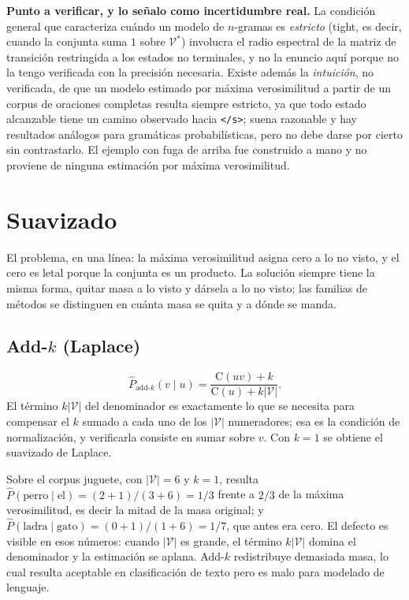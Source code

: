 \documentclass[11pt,letterpaper]{article}
\newcommand{\Count}{\mathrm{C}}
\newcommand{\Vocab}{\mathcal{V}}
\newcommand{\eos}{\texttt{</s>}}
\begin{document}
\begin{observacion}
\textbf{Punto a verificar, y lo señalo como incertidumbre real.} La condición
general que caracteriza cuándo un modelo de $n$-gramas es \emph{estricto}
(tight, es decir, cuando la conjunta suma $1$ sobre $\Vocab^*$) involucra el
radio espectral de la matriz de transición restringida a los estados no
terminales, y no la enuncio aquí porque no la tengo verificada con la precisión
necesaria. Existe además la \emph{intuición}, no verificada, de que un modelo
estimado por máxima verosimilitud a partir de un corpus de oraciones completas
resulta siempre estricto, ya que todo estado alcanzable tiene un camino
observado hacia \eos; suena razonable y hay resultados análogos para gramáticas
probabilísticas, pero no debe darse por cierto sin contrastarlo. El ejemplo con
fuga de arriba fue construido a mano y no proviene de ninguna estimación por
máxima verosimilitud.
\end{observacion}

\section{Suavizado}

El problema, en una línea: la máxima verosimilitud asigna cero a lo no visto, y
el cero es letal porque la conjunta es un producto. La solución siempre tiene la
misma forma, quitar masa a lo visto y dársela a lo no visto; las familias de
métodos se distinguen en cuánta masa se quita y a dónde se manda.

\subsection{Add-$k$ (Laplace)}

\[
\hat{P}_{\text{add-}k}(v\mid u) = \frac{\Count(uv)+k}{\Count(u)+k|\Vocab|} .
\]
El término $k|\Vocab|$ del denominador es exactamente lo que se necesita para
compensar el $k$ sumado a cada uno de los $|\Vocab|$ numeradores; esa es la
condición de normalización, y verificarla consiste en sumar sobre $v$. Con $k=1$
se obtiene el suavizado de Laplace.

Sobre el corpus juguete, con $|\Vocab|=6$ y $k=1$, resulta $\hat
P(\text{perro}\mid\text{el})=(2+1)/(3+6)=1/3$ frente a $2/3$ de la máxima
verosimilitud, es decir la mitad de la masa original; y $\hat
P(\text{ladra}\mid\text{gato})=(0+1)/(1+6)=1/7$, que antes era cero. El defecto
es visible en esos números: cuando $|\Vocab|$ es grande, el término $k|\Vocab|$
domina el denominador y la estimación se aplana. Add-$k$ redistribuye demasiada
masa, lo cual resulta aceptable en clasificación de texto pero es malo para
modelado de lenguaje.
\end{document}
